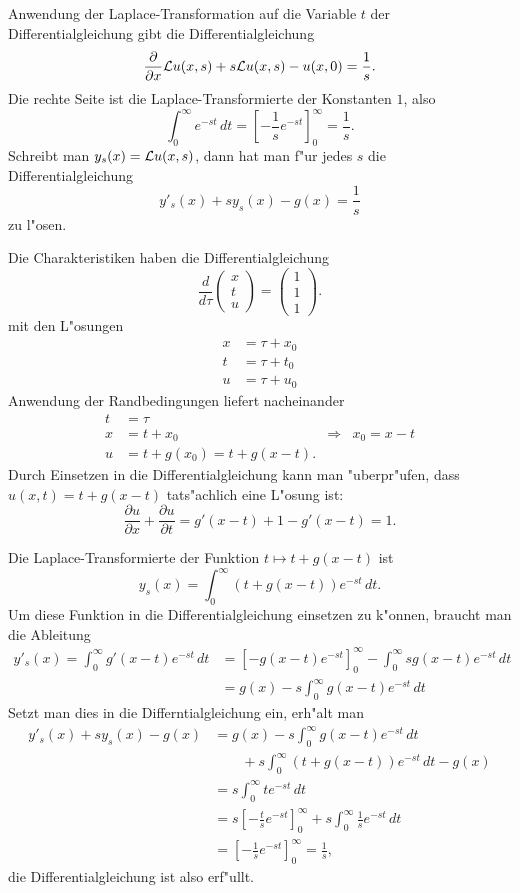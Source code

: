 \begin{loesung}
\begin{teilaufgaben}
\item
Anwendung der Laplace-Transformation auf die Variable $t$ der
Differentialgleichung gibt die Differentialgleichung
\[
\frac{\partial}{\partial x}{\cal L}u(x,s)
+s{\cal L}u(x,s)-u(x,0)=\frac1s.
\]
Die rechte Seite ist die Laplace-Transformierte der Konstanten
$1$, also
\[
\int_0^\infty e^{-st}\,dt
=
\left[
-\frac1s e^{-st}
\right]_0^\infty=\frac1s.
\]
Schreibt man $y_s(x)={\cal L}u(x,s)$, dann hat man
f"ur jedes $s$  die Differentialgleichung
\[
y'_s(x)+sy_s(x)-g(x)=\frac1s
\]
zu l"osen.
\item
Die Charakteristiken haben die Differentialgleichung
\[
\frac{d}{d\tau}\begin{pmatrix}
x\\t\\u
\end{pmatrix}
=\begin{pmatrix}
1\\1\\1
\end{pmatrix}.
\]
mit den L"osungen
\begin{align*}
x&=\tau + x_0\\
t&=\tau + t_0\\
u&=\tau + u_0
\end{align*}
Anwendung der Randbedingungen liefert nacheinander
\begin{align*}
t&=\tau\\
x&=t+x_0
&\Rightarrow&x_0=x-t\\
u&=t+g(x_0)=t+g(x-t).
\end{align*}
Durch Einsetzen in die Differentialgleichung kann man "uberpr"ufen,
dass $u(x,t)=t+g(x-t)$ tats"achlich eine L"osung ist:
\[
\frac{\partial u}{\partial x}+\frac{\partial u}{\partial t}
=
g'(x-t)+1-g'(x-t)=1.
\]
\item
Die Laplace-Transformierte der Funktion $t\mapsto t+g(x-t)$ ist
\[
y_s(x)=\int_0^\infty (t+g(x-t))e^{-st}\,dt.
\]
Um diese Funktion in die Differentialgleichung einsetzen zu k"onnen,
braucht man die Ableitung
\begin{align*}
y'_s(x)=\int_0^\infty g'(x-t)e^{-st}\,dt
&=\left[-g(x-t)e^{-st}\right]_0^\infty
-\int_0^\infty sg(x-t)e^{-st}\,dt
\\
&=g(x)-s\int_0^\infty g(x-t) e^{-st}\,dt
\end{align*}
Setzt man dies in die Differntialgleichung ein, erh"alt man
\begin{align*}
y'_s(x)+sy_s(x)-g(x)&=g(x)-s\int_0^\infty g(x-t)e^{-st}\,dt
\\
&\qquad
+s\int_0^\infty (t+g(x-t)) e^{-st}\,dt-g(x)
\\
&=s\int_0^\infty te^{-st}\,dt
\\
&=s\left[-\frac{t}{s}e^{-st}\right]_0^\infty
+s\int_0^\infty\frac{1}{s}e^{-st}\,dt
\\
&=\left[-\frac1s e^{-st}\right]_0^\infty
=\frac1s,
\end{align*}
die Differentialgleichung ist also erf"ullt.
\end{teilaufgaben}
\end{loesung}
